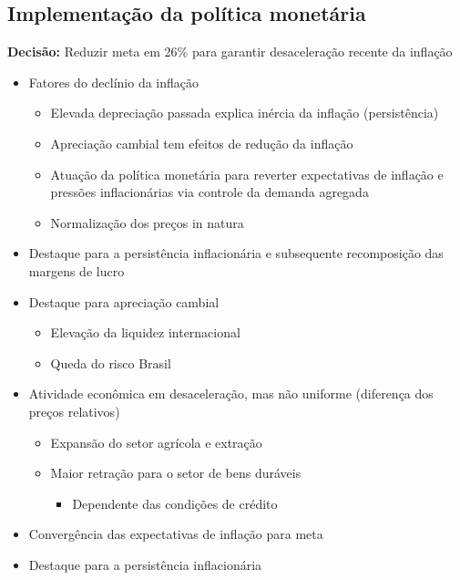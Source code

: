 \documentclass[11pt]{article}
\begin{document}
\subsection*{Implementação da política monetária}
\label{sec:org6f6aac2}
\textbf{Decisão:} Reduzir meta em 26\% para garantir desaceleração recente da inflação
\begin{itemize}
\item Fatores do declínio da inflação
\begin{itemize}
\item Elevada depreciação passada explica inércia da inflação (persistência)
\item Apreciação cambial tem efeitos de redução da inflação
\item Atuação da política monetária para reverter expectativas de inflação e pressões inflacionárias via controle da demanda agregada
\item Normalização dos preços in natura
\end{itemize}
\item Destaque para a persistência inflacionária e subsequente recomposição das margens de lucro
\item Destaque para apreciação cambial
\begin{itemize}
\item Elevação da liquidez internacional
\item Queda do risco Brasil
\end{itemize}
\item Atividade econômica em desaceleração, mas não uniforme (diferença dos preços relativos)
\begin{itemize}
\item Expansão do setor agrícola e extração
\item Maior retração para o setor de bens duráveis 
\begin{itemize}
\item Dependente das condições de crédito
\end{itemize}
\end{itemize}
\item Convergência das expectativas de inflação para meta
\item Destaque para a persistência inflacionária
\end{itemize}
\end{document}
